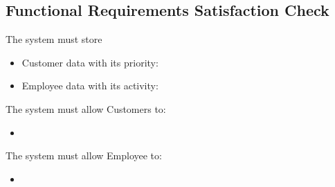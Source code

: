 \subsection{Functional Requirements Satisfaction Check}

The system must store
\begin{itemize}
	\item Customer data with its priority:
\end{itemize}
\begin{itemize}
	\item Employee data with its activity:
\end{itemize}

The system must allow Customers to:
\begin{itemize}
	\item 
\end{itemize}

The system must allow Employee to:
\begin{itemize}
	\item 
\end{itemize}